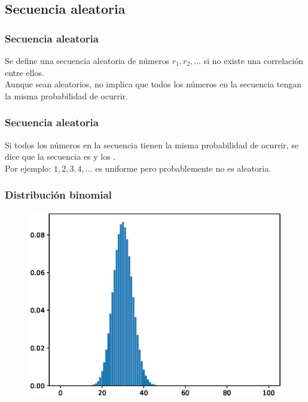 \documentclass[12pt]{beamer}
\begin{document}
\subsection{Secuencia aleatoria}
\begin{frame}
\frametitle{Secuencia aleatoria}
Se define una secuencia aleatoria de números $r_{1}, r_{2}, \ldots$ si no existe una correlación entre ellos.
\\
\bigskip
\pause
Aunque sean aleatorios, no implica que todos los números en la secuencia tengan la misma probabilidad de ocurrir.
\end{frame}
\begin{frame}
\frametitle{Secuencia aleatoria}
Si todos los números en la secuencia tienen la misma probabilidad de ocurrir, se dice que la secuencia es  y los .
\\
\bigskip
\pause
Por ejemplo: $1, 2, 3, 4, \ldots$ es uniforme pero probablemente no es aleatoria.
\end{frame}
\begin{frame}
\frametitle{Distribución binomial}
\begin{figure}
  \centering
  \includegraphics[scale=0.6]{Imagenes/plot_distribucion_01_binomial.eps}
\end{figure}
\end{frame}
\end{document}
